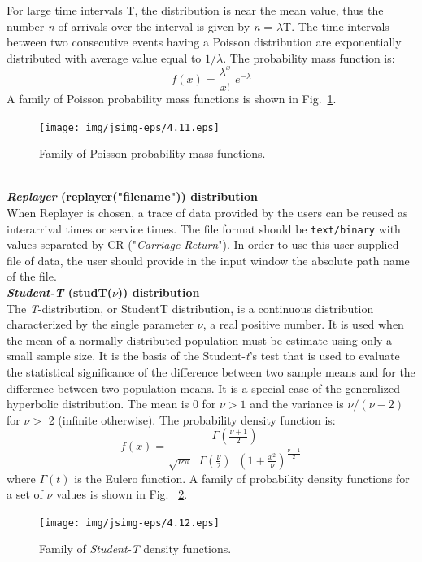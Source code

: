 For large time intervals T, the distribution is near the mean
value, thus the number \emph{n} of arrivals over the interval is
given by \emph{n} = $\lambda$T. The time intervals between two
consecutive events having a Poisson distribution are exponentially
distributed with average value equal to $1/\lambda$. The
probability mass function is:
\[ f(x) = \frac{\lambda^x}{x!} \; e^{-\lambda}
\]
A family of Poisson probability mass functions is shown in
Fig.~\ref{fig:famPois}.
\begin{figure}[htb]
    \begin{center}
        \texttt{[image: img/jsimg-eps/4.11.eps]}
    \end{center}
    \caption{Family of Poisson probability mass functions.}
    \label{fig:famPois}
\end{figure}\\

\textbf{\emph{Replayer} (replayer("filename")) distribution}\\
When Replayer is chosen, a trace of data provided by the users can
be reused as interarrival times or service times. The file format
should be \texttt{text/binary} with values separated by CR
("\emph{Carriage Return}"). In order to use this user-supplied
file of data, the user should provide in the input window the
absolute path name of the file.\\

\textbf{\emph{Student-T} (studT($\nu$)) distribution}\\
The \emph{T}-distribution, or StudentT distribution, is a continuous
distribution characterized by the single parameter $\nu$, a real
positive number. It is used when the mean of a normally
distributed population must be estimate using only a small sample
size. It is the basis of the Student-\emph{t}'s test that is used to
evaluate the statistical significance of the difference between
two sample means and for the difference between two population
means. It is a special case of the generalized hyperbolic
distribution. The mean is 0 for $\nu>1$ and the variance is
$\nu/(\nu-2)$ for $\nu >$ 2 (infinite otherwise). The probability
density function is:
\[ f(x) = \frac{\Gamma(\frac{\nu+1}{2})}{\sqrt{\nu \pi} \;\;
\Gamma(\frac{\nu}{2}) \;\; (1+\frac{x^2}
{\nu})^\frac{\nu+1}{2}}
\]
where $\Gamma(t)$ is the Eulero function. A family of probability
density functions for a set of $\nu$ values is shown in Fig.
~\ref{fig:famStut}.
\begin{figure}[htb]
    \begin{center}
        \texttt{[image: img/jsimg-eps/4.12.eps]}
    \end{center}
    \caption{Family of \emph{Student-T} density functions.}
    \label{fig:famStut}
\end{figure}\\

